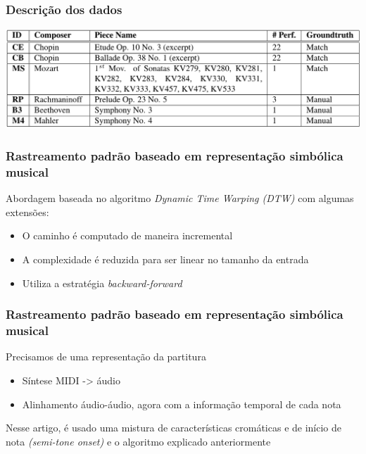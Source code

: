 \begin{frame}
  \frametitle{Descrição dos dados}
  \pause
  \begin{center}
    \includegraphics[width=\textwidth]{src/img/1-Table1-1.png}
  \end{center}
\end{frame}

\begin{frame}
  \frametitle{Rastreamento padrão baseado em representação simbólica musical}
  Abordagem baseada no algoritmo \emph{Dynamic Time Warping (DTW)} com algumas extensões:\pause
  \begin{itemize}
    \item O caminho é computado de maneira incremental\\\pause
    \item A complexidade é reduzida para ser linear no tamanho da entrada\pause
    \item Utiliza a estratégia \emph{backward-forward}
  \end{itemize}
\end{frame}

\begin{frame}
  \frametitle{Rastreamento padrão baseado em representação simbólica musical}
  Precisamos de uma representação da partitura\pause
  \begin{itemize}
    \item Síntese MIDI -> áudio\\\pause
    \item Alinhamento áudio-áudio, agora com a informação temporal de cada nota\pause
  \end{itemize}
  Nesse artigo, é usado uma mistura de características cromáticas e de início de nota \emph{(semi-tone onset)} e o algoritmo explicado anteriormente
\end{frame}

